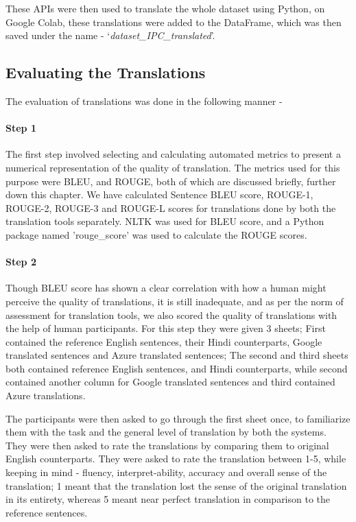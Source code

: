 These APIs were then used to translate the whole dataset using Python, on Google Colab, these translations were added to the DataFrame, which was then saved under the name - `\textit{dataset\_IPC\_translated}'.

\subsection{Evaluating the Translations}

The evaluation of translations was done in the following manner - 

\paragraph{Step 1} The first step involved selecting and calculating automated metrics to present a numerical representation of the quality of translation. The metrics used for this purpose were BLEU, and ROUGE, both of which are discussed briefly, further down this chapter. We have calculated Sentence BLEU score, ROUGE-1, ROUGE-2, ROUGE-3 and ROUGE-L scores for translations done by both the translation tools separately. NLTK was used for BLEU score, and a Python package named 'rouge\_score' was used to calculate the ROUGE scores.

\paragraph{Step 2} Though BLEU score has shown a clear correlation with how a human might perceive the quality of translations, it is still inadequate, and as per the norm of assessment for translation tools, we also scored the quality of translations with the help of human participants. For this step they were given 3 sheets; First contained the reference English sentences, their Hindi counterparts, Google translated sentences and Azure translated sentences; The second and third sheets both contained reference English sentences, and Hindi counterparts, while second contained another column for Google translated sentences and third contained Azure translations.

The participants were then asked to go through the first sheet once, to familiarize them with the task and the general level of translation by both the systems. They were then asked to rate the translations by comparing them to original English counterparts. They were asked to rate the translation between 1-5, while keeping in mind - fluency, interpret-ability, accuracy and overall sense of the translation; 1 meant that the translation lost the sense of the original translation in its entirety, whereas 5 meant near perfect translation in comparison to the reference sentences.

